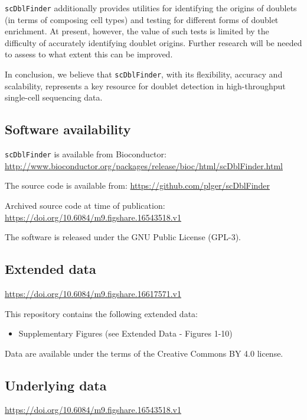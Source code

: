 \documentclass[10pt,a4paper,twocolumn]{article}
\begin{document}
\texttt{scDblFinder} additionally provides utilities for identifying the origins of doublets (in terms of composing cell types) and testing for different forms of doublet enrichment. At present, however, the value of such tests is limited by the difficulty of accurately identifying doublet origins. Further research will be needed to assess to what extent this can be improved.

In conclusion, we believe that \texttt{scDblFinder}, with its flexibility, accuracy and scalability, represents a key resource for doublet detection in high-throughput single-cell sequencing data.





\subsection*{Software availability}

\texttt{scDblFinder} is available from Bioconductor: \url{http://www.bioconductor.org/packages/release/bioc/html/scDblFinder.html}

The source code is available from: \url{https://github.com/plger/scDblFinder}

Archived source code at time of publication: \url{https://doi.org/10.6084/m9.figshare.16543518.v1}

The software is released under the GNU Public License (GPL-3).

\subsection*{Extended data}

\url{https://doi.org/10.6084/m9.figshare.16617571.v1}

This repository contains the following extended data:

\begin{itemize}
\tightlist
\item
  Supplementary Figures (see Extended Data - Figures 1-10)
\end{itemize}

Data are available under the terms of the Creative Commons BY 4.0 license.

\subsection*{Underlying data}

\url{https://doi.org/10.6084/m9.figshare.16543518.v1}
\end{document}
